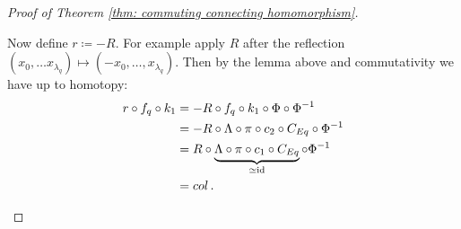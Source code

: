 \begin{proof}[Proof of Theorem \ref{thm: commuting connecting homomorphism}]
\begin{itemize}
\begin{fdiagram}

			\end{fdiagram}
			Now define $r\coloneq -R$. For example apply $R$ after the reflection $(x_0,\dots x_{\lambda_q})\mapsto (-x_0,\dots,x_{\lambda_q})$. Then by the lemma above and commutativity we have up to homotopy:
			\begin{align*}
				r\circ f_q\circ k_1 
				&=  	-R\circ f_q\circ k_1 \circ \Phi \circ \Phi^{-1}\\
				&=  	-R\circ \Lambda \circ \pi\circ c_2\circ C_{Eq} \circ \Phi^{-1}\\
				&=  	R\circ \underbrace{\Lambda \circ \pi\circ c_1\circ C_{Eq} }_{\simeq \operatorname{\mathrm{id}}}\circ\Phi^{-1}\\
				&=		col\, .
			\end{align*}
			

\end{itemize}
\end{proof}
